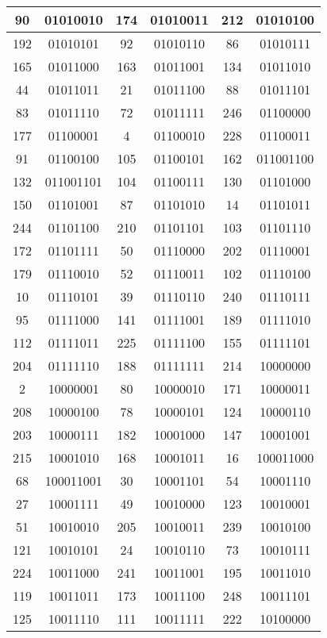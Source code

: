 \documentclass[conference,onecolumn,12pt]{IEEEtran}
\numberwithin{equation}{subsection}
\begin{document}
\begin{table}[h]
\begin{tabular}{cccccc}
90 & 01010010 & 174 & 01010011 & 212 & 01010100 \\ \hline
192 & 01010101 & 92 & 01010110 & 86 & 01010111 \\ \hline
165 & 01011000 & 163 & 01011001 & 134 & 01011010 \\ \hline
44 & 01011011 & 21 & 01011100 & 88 & 01011101 \\ \hline
83 & 01011110 & 72 & 01011111 & 246 & 01100000 \\ \hline
177 & 01100001 & 4 & 01100010 & 228 & 01100011 \\ \hline
91 & 01100100 & 105 & 01100101 & 162 & 011001100 \\ \hline
132 & 011001101 & 104 & 01100111 & 130 & 01101000 \\ \hline
150 & 01101001 & 87 & 01101010 & 14 & 01101011 \\ \hline
244 & 01101100 & 210 & 01101101 & 103 & 01101110 \\ \hline
172 & 01101111 & 50 & 01110000 & 202 & 01110001 \\ \hline
179 & 01110010 & 52 & 01110011 & 102 & 01110100 \\ \hline
10 & 01110101 & 39 & 01110110 & 240 & 01110111 \\ \hline
95 & 01111000 & 141 & 01111001 & 189 & 01111010 \\ \hline
112 & 01111011 & 225 & 01111100 & 155 & 01111101 \\ \hline
204 & 01111110 & 188 & 01111111 & 214 & 10000000 \\ \hline
2 & 10000001 & 80 & 10000010 & 171 & 10000011 \\ \hline
208 & 10000100 & 78 & 10000101 & 124 & 10000110 \\ \hline
203 & 10000111 & 182 & 10001000 & 147 & 10001001 \\ \hline
215 & 10001010 & 168 & 10001011 & 16 & 100011000 \\ \hline
68 & 100011001 & 30 & 10001101 & 54 & 10001110 \\ \hline
27 & 10001111 & 49 & 10010000 & 123 & 10010001 \\ \hline
51 & 10010010 & 205 & 10010011 & 239 & 10010100 \\ \hline
121 & 10010101 & 24 & 10010110 & 73 & 10010111 \\ \hline
224 & 10011000 & 241 & 10011001 & 195 & 10011010 \\ \hline
119 & 10011011 & 173 & 10011100 & 248 & 10011101 \\ \hline
125 & 10011110 & 111 & 10011111 & 222 & 10100000 \\ \hline

\end{tabular}
\end{table}
\end{document}
